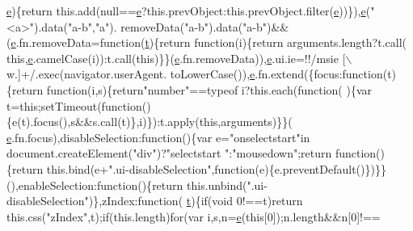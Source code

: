 \begin{DoxyCode}
      \hyperlink{jquery-ui_8min_8js_a2c038346d47955cbe2cb91e338edd7e1}{e})\{\textcolor{keywordflow}{return} this.add(null==\hyperlink{jquery-ui_8min_8js_a2c038346d47955cbe2cb91e338edd7e1}{e}?this.prevObject:this.prevObject.filter(\hyperlink{jquery-ui_8min_8js_a2c038346d47955cbe2cb91e338edd7e1}{e}))\}),\hyperlink{jquery-ui_8min_8js_a2c038346d47955cbe2cb91e338edd7e1}{e}(\textcolor{stringliteral}{"<a>"}).data(\textcolor{stringliteral}{"a-b"},\textcolor{stringliteral}{"a"}).
      removeData(\textcolor{stringliteral}{"a-b"}).data(\textcolor{stringliteral}{"a-b"})&&(\hyperlink{jquery-ui_8min_8js_a2c038346d47955cbe2cb91e338edd7e1}{e}.fn.removeData=\textcolor{keyword}{function}(\hyperlink{jquery-2_80_83_8min_8js_aaccc9105df5383111407fd5b41255e23}{t})\{\textcolor{keywordflow}{return} \textcolor{keyword}{function}(i)\{\textcolor{keywordflow}{return} arguments.length?t.call(\textcolor{keyword}{
      this},\hyperlink{jquery-ui_8min_8js_a2c038346d47955cbe2cb91e338edd7e1}{e}.camelCase(i)):t.call(\textcolor{keyword}{this})\}\}(\hyperlink{jquery-ui_8min_8js_a2c038346d47955cbe2cb91e338edd7e1}{e}.fn.removeData)),\hyperlink{jquery-ui_8min_8js_a2c038346d47955cbe2cb91e338edd7e1}{e}.ui.ie=!!/msie [\(\backslash\)w.]+/.exec(navigator.userAgent.
      toLowerCase()),\hyperlink{jquery-ui_8min_8js_a2c038346d47955cbe2cb91e338edd7e1}{e}.fn.extend(\{focus:function(t)\{return function(i,s)\{return\textcolor{stringliteral}{"number"}==typeof i?this.each(function(
      )\{var t=this;setTimeout(function()\{e(t).focus(),s&&s.call(t)\},i)\}):t.apply(this,arguments)\}\}(
      \hyperlink{jquery-ui_8min_8js_a2c038346d47955cbe2cb91e338edd7e1}{e}.fn.focus),disableSelection:\textcolor{keyword}{function}()\{var e=\textcolor{stringliteral}{"onselectstart"}in document.createElement(\textcolor{stringliteral}{"div"})?\textcolor{stringliteral}{"selectstart
      "}:\textcolor{stringliteral}{"mousedown"};return function()\{return this.bind(e+\textcolor{stringliteral}{".ui-disableSelection"},function(e)\{e.preventDefault()\})\}\}
      (),enableSelection:\textcolor{keyword}{function}()\{\textcolor{keywordflow}{return} this.unbind(\textcolor{stringliteral}{".ui-disableSelection"})\},zIndex:\textcolor{keyword}{function}(
      \hyperlink{jquery-2_80_83_8min_8js_aaccc9105df5383111407fd5b41255e23}{t})\{\textcolor{keywordflow}{if}(\textcolor{keywordtype}{void} 0!==t)\textcolor{keywordflow}{return} this.css(\textcolor{stringliteral}{"zIndex"},t);\textcolor{keywordflow}{if}(this.length)\textcolor{keywordflow}{for}(var i,s,n=\hyperlink{jquery-ui_8min_8js_a2c038346d47955cbe2cb91e338edd7e1}{e}(\textcolor{keyword}{this}[0]);n.length&&n[0]!==

\end{DoxyCode}
